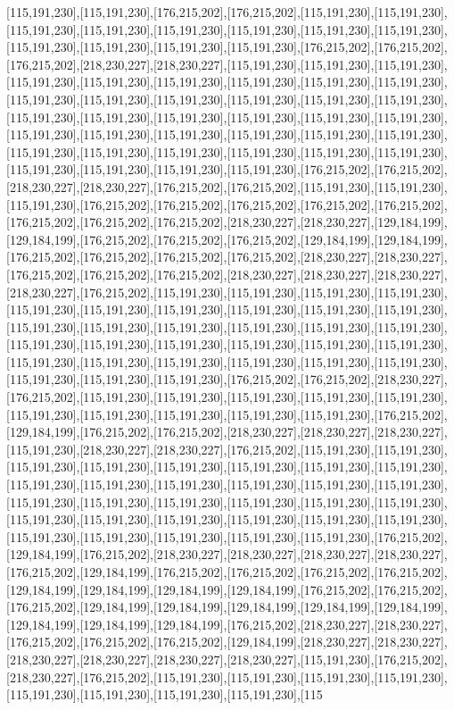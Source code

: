 [115,191,230],[115,191,230],[176,215,202],[176,215,202],[115,191,230],[115,191,230],[115,191,230],[115,191,230],[115,191,230],[115,191,230],[115,191,230],[115,191,230],[115,191,230],[115,191,230],[115,191,230],[115,191,230],[176,215,202],[176,215,202],[176,215,202],[218,230,227],[218,230,227],[115,191,230],[115,191,230],[115,191,230],[115,191,230],[115,191,230],[115,191,230],[115,191,230],[115,191,230],[115,191,230],[115,191,230],[115,191,230],[115,191,230],[115,191,230],[115,191,230],[115,191,230],[115,191,230],[115,191,230],[115,191,230],[115,191,230],[115,191,230],[115,191,230],[115,191,230],[115,191,230],[115,191,230],[115,191,230],[115,191,230],[115,191,230],[115,191,230],[115,191,230],[115,191,230],[115,191,230],[115,191,230],[115,191,230],[115,191,230],[115,191,230],[115,191,230],[115,191,230],[176,215,202],[176,215,202],[218,230,227],[218,230,227],[176,215,202],[176,215,202],[115,191,230],[115,191,230],[115,191,230],[176,215,202],[176,215,202],[176,215,202],[176,215,202],[176,215,202],[176,215,202],[176,215,202],[176,215,202],[218,230,227],[218,230,227],[129,184,199],[129,184,199],[176,215,202],[176,215,202],[176,215,202],[129,184,199],[129,184,199],[176,215,202],[176,215,202],[176,215,202],[176,215,202],[218,230,227],[218,230,227],[176,215,202],[176,215,202],[176,215,202],[218,230,227],[218,230,227],[218,230,227],[218,230,227],[176,215,202],[115,191,230],[115,191,230],[115,191,230],[115,191,230],[115,191,230],[115,191,230],[115,191,230],[115,191,230],[115,191,230],[115,191,230],[115,191,230],[115,191,230],[115,191,230],[115,191,230],[115,191,230],[115,191,230],[115,191,230],[115,191,230],[115,191,230],[115,191,230],[115,191,230],[115,191,230],[115,191,230],[115,191,230],[115,191,230],[115,191,230],[115,191,230],[115,191,230],[115,191,230],[115,191,230],[115,191,230],[176,215,202],[176,215,202],[218,230,227],[176,215,202],[115,191,230],[115,191,230],[115,191,230],[115,191,230],[115,191,230],[115,191,230],[115,191,230],[115,191,230],[115,191,230],[115,191,230],[176,215,202],[129,184,199],[176,215,202],[176,215,202],[218,230,227],[218,230,227],[218,230,227],[115,191,230],[218,230,227],[218,230,227],[176,215,202],[115,191,230],[115,191,230],[115,191,230],[115,191,230],[115,191,230],[115,191,230],[115,191,230],[115,191,230],[115,191,230],[115,191,230],[115,191,230],[115,191,230],[115,191,230],[115,191,230],[115,191,230],[115,191,230],[115,191,230],[115,191,230],[115,191,230],[115,191,230],[115,191,230],[115,191,230],[115,191,230],[115,191,230],[115,191,230],[115,191,230],[115,191,230],[115,191,230],[115,191,230],[115,191,230],[115,191,230],[176,215,202],[129,184,199],[176,215,202],[218,230,227],[218,230,227],[218,230,227],[218,230,227],[176,215,202],[129,184,199],[176,215,202],[176,215,202],[176,215,202],[176,215,202],[129,184,199],[129,184,199],[129,184,199],[129,184,199],[176,215,202],[176,215,202],[176,215,202],[129,184,199],[129,184,199],[129,184,199],[129,184,199],[129,184,199],[129,184,199],[129,184,199],[129,184,199],[176,215,202],[218,230,227],[218,230,227],[176,215,202],[176,215,202],[176,215,202],[129,184,199],[218,230,227],[218,230,227],[218,230,227],[218,230,227],[218,230,227],[218,230,227],[115,191,230],[176,215,202],[218,230,227],[176,215,202],[115,191,230],[115,191,230],[115,191,230],[115,191,230],[115,191,230],[115,191,230],[115,191,230],[115,191,230],[115